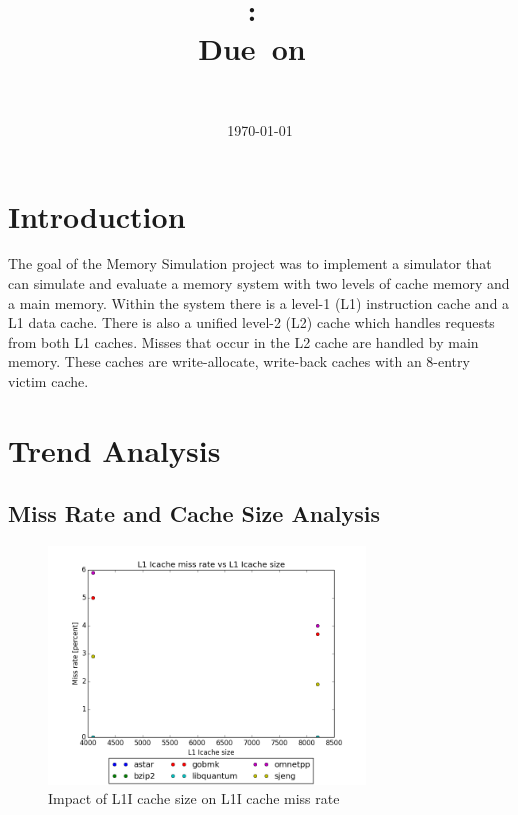 \documentclass{article}
\title{
\vspace{2in}
\textmd{\textbf{\hmwkClass:\ \hmwkTitle}}\\
\normalsize\vspace{0.1in}\small{Due\ on\ \hmwkDueDate}\\
\vspace{3in}
}
\author{
\textbf{\hmwkAuthorName} \\
\hmwkAuthorNumber
}
\date{\today} %
\begin{document}
\maketitle



\newpage
\tableofcontents
\newpage
\lstlistoflistings
\newpage


\section{Introduction}

The goal of the Memory Simulation project was to implement a simulator that can simulate and evaluate a memory system with two levels of cache memory and a main memory. Within the system there is a level-1 (L1) instruction cache and a L1 data cache. There is also a unified level-2 (L2) cache which handles requests from both L1 caches. Misses that occur in the L2 cache are handled by main memory. These caches are write-allocate, write-back caches with an 8-entry victim cache. 

\section{Trend Analysis}

\subsection{Miss Rate and Cache Size Analysis}

\begin{figure}[ht]
    \centering
    \includegraphics[width=0.75\textwidth]{plots/L1icache_miss_vs_L1icache_size.png}
    \caption{Impact of L1I cache size on L1I cache miss rate}
    \label{fig:L1imissvsl1isize}
\end{figure}
\end{document}
